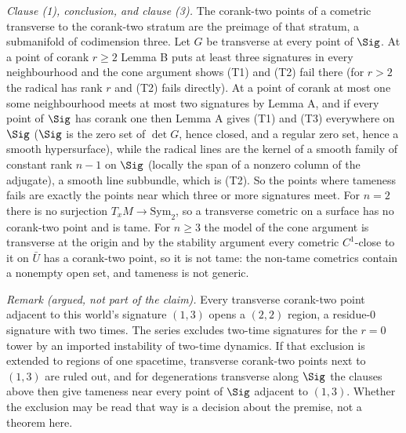 \emph{Clause (1), conclusion, and clause (3).} The corank-two points of a cometric transverse to the corank-two stratum are the preimage of that stratum, a submanifold of codimension three. Let $G$ be transverse at every point of $\Sig$. At a point of corank $r \geq 2$ Lemma B puts at least three signatures in every neighbourhood and the cone argument shows (T1) and (T2) fail there (for $r > 2$ the radical has rank $r$ and (T2) fails directly). At a point of corank at most one some neighbourhood meets at most two signatures by Lemma A, and if every point of $\Sig$ has corank one then Lemma A gives (T1) and (T3) everywhere on $\Sig$ ($\Sig$ is the zero set of $\det G$, hence closed, and a regular zero set, hence a smooth hypersurface), while the radical lines are the kernel of a smooth family of constant rank $n - 1$ on $\Sig$ (locally the span of a nonzero column of the adjugate), a smooth line subbundle, which is (T2). So the points where tameness fails are exactly the points near which three or more signatures meet. For $n = 2$ there is no surjection $T_xM \to \mathrm{Sym}_2$, so a transverse cometric on a surface has no corank-two point and is tame. For $n \geq 3$ the model of the cone argument is transverse at the origin and by the stability argument every cometric $C^1$-close to it on $\bar U$ has a corank-two point, so it is not tame: the non-tame cometrics contain a nonempty open set, and tameness is not generic.

\emph{Remark (argued, not part of the claim).} Every transverse corank-two point adjacent to this world's signature $(1,3)$ opens a $(2,2)$ region, a residue-$0$ signature with two times. The series excludes two-time signatures for the $r = 0$ tower by an imported instability of two-time dynamics. If that exclusion is extended to regions of one spacetime, transverse corank-two points next to $(1,3)$ are ruled out, and for degenerations transverse along $\Sig$ the clauses above then give tameness near every point of $\Sig$ adjacent to $(1,3)$. Whether the exclusion may be read that way is a decision about the premise, not a theorem here.
